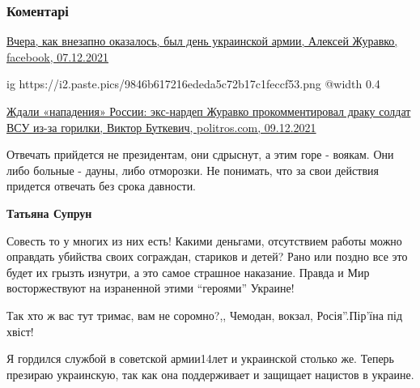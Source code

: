  
 
 
 
 
\subsubsection{Коментарі}

\begin{itemize} %
\href{https://www.facebook.com/100055408874270/posts/406250767898549/?d=n}{%
Вчера, как внезапно оказалось, был день украинской армии, Алексей Журавко, facebook, 07.12.2021%
}

\ifcmt
  ig https://i2.paste.pics/9846b617216ededa5c72b17c1feccf53.png
  @width 0.4
\fi


\href{https://politros.com/227364-zhdali-napadeniya-rossii-eks-nardep-zhuravko-prokommentiroval-draku-soldat-vsu-iz-za-gorilki}{%
Ждали «нападения» России: экс-нардеп Журавко прокомментировал драку солдат ВСУ из-за горилки, Виктор Буткевич, %
politros.com, 09.12.2021%
}


Отвечать прийдется не президентам, они сдрыснут, а этим горе - воякам. Они либо
больные - дауны, либо отморозки. Не понимать, что за свои действия придется
отвечать без срока давности.

\begin{itemize} %
\textbf{Татьяна Супрун} 

Совесть то у многих из них есть! Какими деньгами, отсутствием работы можно
оправдать убийства своих сограждан, стариков и детей? Рано или поздно все это
будет их грызть изнутри, а это самое страшное наказание. Правда и Мир
восторжествуют на израненной этими \enquote{героями} Украине!

\end{itemize} %

Так хто ж вас тут тримає, вам не соромно?,, Чемодан, вокзал, Росія''.Пір'їна під хвіст!


Я гордился службой в советской армии14лет и украинской столько же. Теперь
презираю украинскую, так как она поддерживает и защищает нацистов в украине.


\end{itemize}
